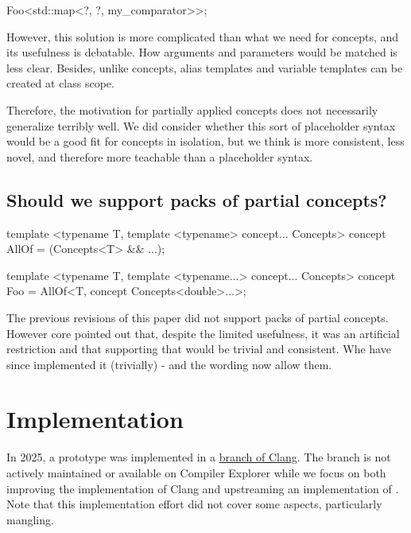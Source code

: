 \documentclass{wg21}
\begin{document}
\begin{colorblock}
Foo<std::map<?, ?, my_comparator>>;
\end{colorblock}

However, this solution is more complicated than what we need for concepts, and its usefulness is debatable.
How arguments and parameters would be matched is less clear.
Besides, unlike concepts, alias templates and variable templates can be created at class scope.

Therefore, the motivation for partially applied concepts does not necessarily generalize terribly well.
We did consider whether this sort of placeholder syntax would be a good fit for concepts in isolation, but
we think  is more consistent, less novel, and
therefore more teachable than a placeholder syntax.

\subsection{Should we support packs of partial concepts?}


\begin{colorblock}
template <typename T, template <typename> concept... Concepts>
concept AllOf = (Concepts<T> && ...);

template <typename T, template <typename...> concept... Concepts>
concept Foo = AllOf<T, concept Concepts<double>...>;
\end{colorblock}

The previous revisions of this paper did not support packs of partial concepts.
However core pointed out that, despite the limited usefulness, it was an artificial restriction and that supporting that would
be trivial and consistent.
Whe have since implemented it (trivially) - and the wording now allow them.


\section{Implementation}

In 2025, a prototype was implemented in a \href{https://github.com/cor3ntin/llvm-project/commit/7fb869e9b6571629258081674de03279ad60ffd3}{branch of Clang}. The branch is not actively maintained or available on Compiler Explorer while we focus on both improving the implementation of Clang and upstreaming an implementation of .
Note that this implementation effort did not cover some aspects, particularly mangling.
\end{document}
